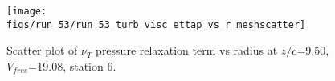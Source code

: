 \begin{figure}[H]
\centering
\texttt{[image: figs/run\_53/run\_53\_turb\_visc\_ettap\_vs\_r\_meshscatter]}
\caption{Scatter plot of $\nu_T$ pressure relaxation term vs radius at $z/c$=9.50, $V_{free}$=19.08, station 6.}
\label{fig:run_53_turb_visc_ettap_vs_r_meshscatter}
\end{figure}


